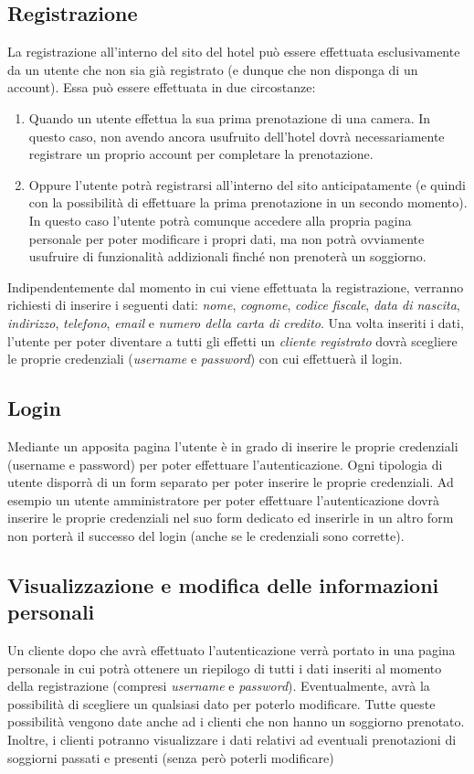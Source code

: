 \documentclass [a4paper, 12pt]{book}
\begin{document}
\subsection{Registrazione}
La registrazione all'interno del sito del hotel può essere effettuata esclusivamente da un utente che non sia già registrato (e dunque che non disponga di un account). Essa può essere effettuata in due circostanze:
\begin{enumerate}
\item Quando un utente effettua la sua prima prenotazione di una camera. In questo caso, non avendo ancora usufruito dell'hotel dovrà necessariamente registrare un proprio account per completare la prenotazione.
\item Oppure l'utente potrà registrarsi all'interno del sito anticipatamente (e quindi con la possibilità di effettuare la prima prenotazione in un secondo momento). In questo caso l'utente potrà comunque accedere alla propria pagina personale per poter modificare i propri dati, ma non potrà ovviamente usufruire di funzionalità addizionali finché non prenoterà un soggiorno.
\end{enumerate}
Indipendentemente dal momento in cui viene effettuata la registrazione, verranno richiesti di inserire i seguenti dati: \textit{nome}, \textit{cognome}, \textit{codice fiscale}, \textit{data di nascita}, \textit{indirizzo}, \textit{telefono}, \textit{email} e \textit{numero della carta di credito}. Una volta inseriti i dati, l'utente per poter diventare a tutti gli effetti un \textit{cliente registrato} dovrà scegliere le proprie credenziali (\textit{username} e \textit{password}) con cui effettuerà il login.

\medskip

\subsection{Login}
\label{Login}
Mediante un apposita pagina l'utente è in grado di inserire le proprie credenziali (username e password) per poter effettuare l'autenticazione. Ogni tipologia di utente disporrà di un form separato per poter inserire le proprie credenziali. Ad esempio un utente amministratore per poter effettuare l'autenticazione dovrà inserire le proprie credenziali nel suo form dedicato ed inserirle in un altro form non porterà il successo del login (anche se le credenziali sono corrette). 

\medskip

\subsection{Visualizzazione e modifica delle informazioni personali}
Un cliente dopo che avrà effettuato l'autenticazione verrà portato in una pagina personale in cui potrà ottenere un riepilogo di tutti i dati inseriti al momento della registrazione (compresi \textit{username} e \textit{password}). Eventualmente, avrà la possibilità di scegliere un qualsiasi dato per poterlo modificare. Tutte queste possibilità vengono date anche ad i clienti che non hanno un soggiorno prenotato. Inoltre, i clienti potranno visualizzare i dati relativi ad eventuali prenotazioni di soggiorni passati e presenti (senza però poterli modificare)
\end{document}
